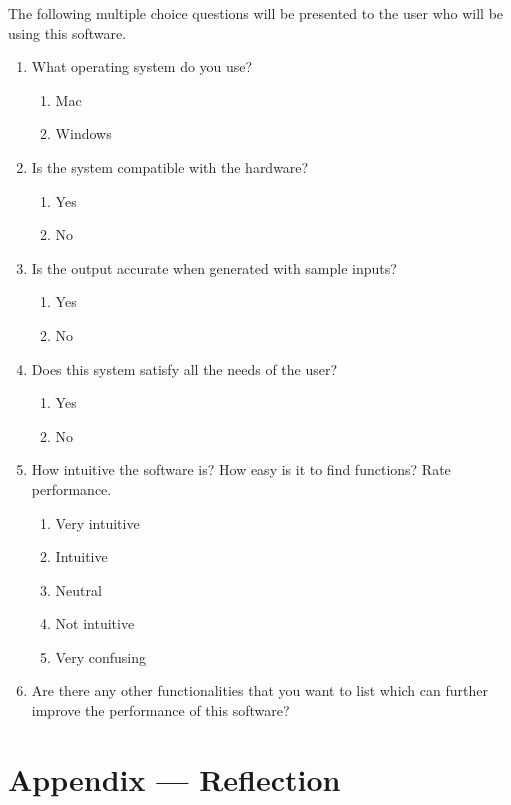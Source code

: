 \documentclass[12pt, titlepage]{article}
\begin{document}
The following multiple choice questions will be presented to the user who will be using this software.
\begin{enumerate}
  
\item What operating system do you use?
  \begin{enumerate}
    \item Mac
    \item Windows
  \end{enumerate}

\item Is the system compatible with the hardware?
  \begin{enumerate}
    \item Yes
    \item No
  \end{enumerate}

\item Is the output accurate when generated with sample inputs?
  \begin{enumerate}
    \item Yes
    \item No
  \end{enumerate}

\item Does this system satisfy all the needs of the user?
  \begin{enumerate}
    \item Yes
    \item No
  \end{enumerate}

\item How intuitive the software is? How easy is it to find functions? Rate performance.
  \begin{enumerate}
    \item Very intuitive
    \item Intuitive
    \item Neutral
    \item Not intuitive
    \item Very confusing
  \end{enumerate}

\item Are there any other functionalities that you want to list which can further improve the performance of this software?

\end{enumerate}


\newpage{}
\section*{Appendix --- Reflection}
\end{document}
